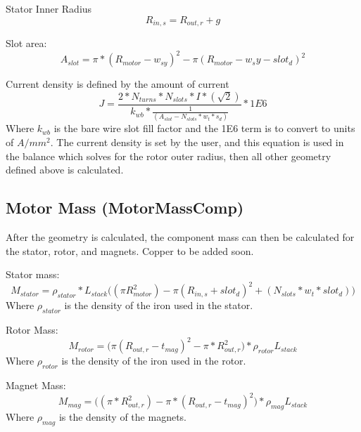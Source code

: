 \documentclass[10pt]{article}
\begin{document}
Stator Inner Radius
\begin{equation}
    R_{in, s} = R_{out, r} + g
\end{equation}

Slot area:
\begin{equation}
    A_{slot} = \pi * (R_{motor} - w_{sy})^{2} - \pi(R_{motor}-w_sy - slot_d)^{2}
\end{equation}

Current density is defined by the amount of current
\begin{equation}
    J = \frac{2*N_{turns}*N_{slots}*I*(\sqrt{2})}{k_{wb} * \frac{1}{(A_{slot}-N_{slots}*w_t*s_d)}}*1E6
\end{equation}
Where $k_{wb}$ is the bare wire slot fill factor and the 1E6 term is to convert to units of $A/mm^2$. The current density is set by the user, and this equation is used in the balance which solves for the rotor outer radius, then all other geometry defined above is calculated.


\subsection{Motor Mass (MotorMassComp)}
After the geometry is calculated, the component mass can then be calculated for the stator, rotor, and magnets. Copper to be added soon.

Stator mass:
\begin{equation}
    M_{stator} = \rho_{stator}*L_{stack} \Big((\pi R_{motor}^2) - \pi(R_{in,s}+slot_d)^2+(N_{slots}*w_t*slot_d)\Big)
\end{equation}
Where $\rho_{stator}$ is the density of the iron used in the stator.

Rotor Mass:
\begin{equation}
    M_{rotor} = \big(\pi (R_{out,r} - t_{mag})^2 - \pi*R_{out,r}^2\big) * \rho_{rotor}  L_{stack}
\end{equation}
Where $\rho_{rotor}$ is the density of the iron used in the rotor.

Magnet Mass:
\begin{equation}
    M_{mag} = \Big((\pi*R_{out,r}^2) - \pi*(R_{out,r}-t_{mag})^2\Big) * \rho_{mag} L_{stack}
\end{equation}
Where $\rho_{mag}$ is the density of the magnets.
\end{document}
